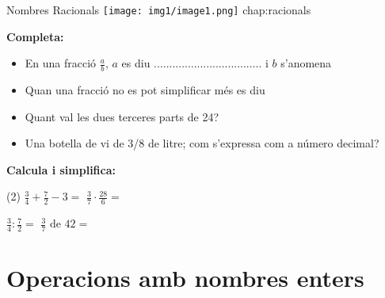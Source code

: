 {Nombres Racionals}
{\texttt{[image: img1/image1.png]}}
{chap:racionals}
 
\vspace{1cm}
\begin{iniaval}
	\textbf{Completa:}
	
	\begin{itemize}
		\item En una fracció $\frac{a}{b}$, $a$ es diu ................................... i $b$ s'anomena \dotfill
		
		\item  Quan una fracció no es pot simplificar més es diu \dotfill
		
		\item  Quant val les dues terceres parts de 24?  \dotfill
		
		\item  Una botella de vi de 3/8 de litre; com s'expressa com a número decimal? \dotfill
	\end{itemize}
	
	\vspace{0.5cm}
	\textbf{Calcula i simplifica:}
	
	\begin{tasks}(2)
		\task $\frac{3}{4}+\frac{7}{2}-3=$    \task $\frac{3}{7}\cdot\frac{28}{6}=$
		
		\task $\frac{3}{4}:\frac{7}{2}=$      \task $\frac{3}{7} \text{ de } 42=$
	\end{tasks}	

	\vsoo
\end{iniaval}



\newpage
\section{Operacions amb nombres enters}

